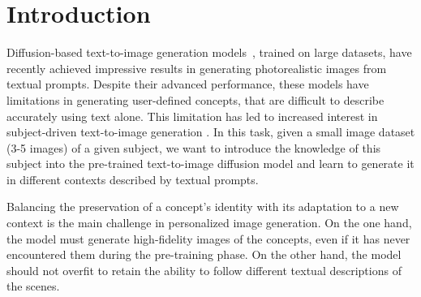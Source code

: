 \section{Introduction}
\label{sec:intro}


Diffusion-based text-to-image generation models~\citep{ramesh2022hierarchical, saharia2022photorealistic, rombach2022high}, trained on large datasets, have recently achieved impressive results in generating photorealistic images from textual prompts. Despite their advanced performance, these models have limitations in generating user-defined concepts, that are difficult to describe accurately using text alone. This limitation has led to increased interest in subject-driven text-to-image generation \citep{DB, TI}. In this task, given a small image dataset (3-5 images) of a given subject, we want to introduce the knowledge of this subject into the pre-trained text-to-image diffusion model and learn to generate it in different contexts described by textual prompts.


Balancing the preservation of a concept's identity with its adaptation to a new context is the main challenge in personalized image generation. On the one hand, the model must generate high-fidelity images of the concepts, even if it has never encountered them during the pre-training phase. On the other hand, the model should not overfit to retain the ability to follow different textual descriptions of the scenes. 


